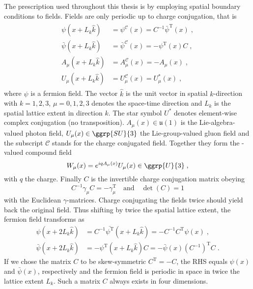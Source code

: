 The prescription used throughout this thesis is  by employing spatial \Cstar boundary conditions to fields.
Fields are only periodic up to charge conjugation, that is
\begin{align} \label{eq:cstar:bcs}
  \begin{split}
    \psi(x + L_k \hat{k})       &= \psi^{\mathcal{C}}(x)       = C^{-1}\bar{\psi}^{\text{T}}(x) \;, \\
    \bar{\psi}(x + L_k \hat{k}) &= \bar{\psi}^{\mathcal{C}}(x) = -\psi^{\text{T}}(x)C \;, \\
    A_{\mu}(x + L_k \hat{k})    &= A_{\mu}^{\mathcal{C}}(x)    = - A_{\mu}(x) \;, \\
    U_{\mu}(x + L_k \hat{k})    &= U_{\mu}^{\mathcal{C}}(x)    = U_{\mu}^{*}(x) \;,
  \end{split}
\end{align}
where $\psi$ is a fermion field.
The vector $\hat{k}$ is the unit vector in spatial $k$-direction with $k=1,2,3$, $\mu=0,1,2,3$ denotes the space-time direction and $L_k$ is the spatial lattice extent in direction $k$.
The star symbol $U^{*}$ denotes element-wise complex conjugation (no transposition).
$A_{\mu}(x) \in \mathfrak{u}(1)$ is the Lie-algebra-valued photon field, $U_{\mu}(x) \in \ggrp{SU}{3}$ the Lie-group-valued gluon field and the subscript $\mathcal{C}$ stands for the charge conjugated field.
Together they form the -valued compound field
\begin{equation}
W_{\mu}(x) = e^{i q A_\mu(x)} U_\mu(x) \in \ggrp{U}{3} \;,
\end{equation}
with $q$ the charge.
Finally $C$ is the invertible charge conjugation matrix obeying
\begin{equation}
  C^{-1} \gamma_{\mu} C = - \gamma_{\mu}^{\text{T}}
  \quad
  \text{and}
  \quad
  \det(C) = 1
\end{equation}
with the Euclidean $\gamma$-matrices.
Charge conjugating the fields twice should yield back the original field.
Thus shifting by twice the spatial lattice extent, the fermion field transforms as
\begin{align}
  \psi(x + 2 L_k \hat{k}) &= C^{-1}\bar{\psi^{\text{T}}}(x + L_k \hat{k}) = - C^{-1} C^{\text{T}} \psi(x) \;, \\
  \bar{\psi}(x + 2 L_k \hat{k}) &= -\psi^{\text{T}}(x + L_k \hat{k})C = - \bar{\psi}(x) (C^{-1})^{\text{T}} C \;.
\end{align}
If we chose the matrix $C$ to be skew-symmetric $C^{\text{T}} = -C$, the RHS equals $\psi(x)$ and $\bar{\psi}(x)$, respectively and the fermion field is periodic in space in twice the lattice extent $L_k$. Such a matrix $C$ always exists in four dimensions.

